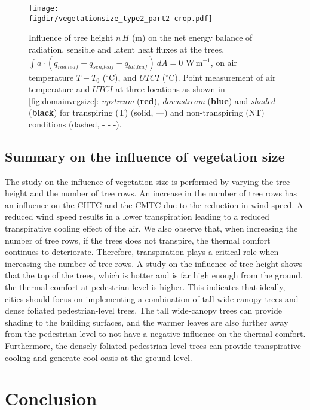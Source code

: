 	\begin{figure}[t]
	\centering
	\texttt{[image: \\figdir/vegetationsize\_type2\_part2-crop.pdf]}
	\caption{Influence of tree height $n\,H$ (m) on  the net energy balance of radiation, sensible and latent heat fluxes at the trees, $\int a \cdot (q_{\textit{rad,leaf}}-q_{\textit{sen,leaf}}-q_{\textit{lat,leaf}})\ dA = 0$ W\,m$^{-1}$,  on air temperature $T-T_0$ ($^{\circ}$C), and  $\textit{UTCI}$ ($^{\circ}$C). Point measurement of air temperature and $UTCI$ at three locations as shown in \cref{fig:domainvegsize}: \textit{upstream} ({\color{flatuidarkred}\textbf{red}}), \textit{downstream} ({\color{flatuidarkblue}\textbf{blue}}) and \textit{shaded} (\textbf{black}) for transpiring (T) (solid, ---) and non-transpiring (NT) conditions (dashed, - - -).}
	\label{fig:vegetationsizepart2}
	\end{figure}

\subsection{Summary on the influence of vegetation size}

The study on the influence of vegetation size is performed by varying the tree height and the number of tree rows. An increase in the number of tree rows has an influence on the CHTC and the CMTC due to the reduction in wind speed. A reduced wind speed results in a lower transpiration leading to a reduced transpirative cooling effect of the air. We also observe that, when increasing the number of tree rows, if the trees does not transpire, the thermal comfort continues to deteriorate. Therefore, transpiration plays a critical role when increasing the number of tree rows. A study on the influence of tree height shows that the top of the trees, which is hotter and is far high enough from the ground, the thermal comfort at pedestrian level is higher. This indicates that ideally, cities should focus on implementing a combination of tall wide-canopy trees and dense foliated pedestrian-level trees. The tall wide-canopy trees can provide shading to the building surfaces, and the warmer leaves are also further away from the pedestrian level to not have a negative influence on the thermal comfort. Furthermore, the densely foliated pedestrian-level trees can provide transpirative cooling and generate cool oasis at the ground level.


\section{Conclusion}

